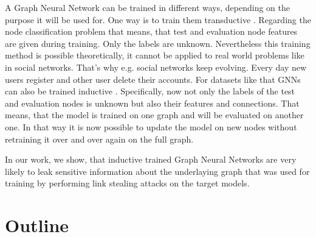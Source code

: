 		A Graph Neural Network can be trained in different ways, depending on the purpose it will be used for.
		One way is to train them transductive \cite{5206871, ZHA2010187, WANG2017218, 10.1007/978-3-642-04174-7_29}.
		Regarding the node classification problem that means, that test and evaluation node features are given during training.
		Only the labels are unknown.
		Nevertheless this training method is possible theoretically, it cannot be applied to real world problems like in social networks.
		That's why e.g. social networks keep evolving.
		Every day new users register and other user delete their accounts.
		For datasets like that GNNs can also be trained inductive \cite{zeng2020graphsaint, 8519335, zhang2020document}.
		Specifically, now not only the labels of the test and evaluation nodes is unknown but also their features and connections.
		That means, that the model is trained on one graph and will be evaluated on another one.
		In that way it is now possible to update the model on new nodes without retraining it over and over again on the full graph.

		In our work, we show, that inductive trained Graph Neural Networks are very likely to leak sensitive information about the underlaying graph that was used for training by performing link stealing attacks on the target models.

	\section{Outline}
